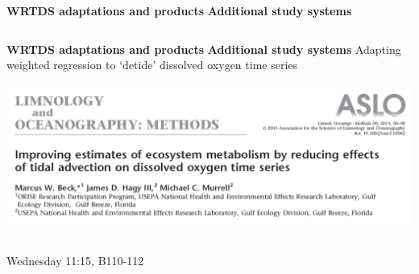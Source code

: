 \documentclass[serif]{beamer}\usepackage[]{graphicx}\usepackage[]{color}
\begin{document}
\begin{frame}{\textbf{WRTDS adaptations and products}}{\textbf{ Additional study systems}}
\begin{columns}
\begin{column}{0.65\textwidth}
\end{column}
\end{columns}
\end{frame}

\begin{frame}{\textbf{WRTDS adaptations and products}}{\textbf{ Additional study systems}}
Adapting weighted regression to `detide' dissolved oxygen time series \cite{Beck15b}\\~\\
\includegraphics[width = \textwidth]{fig/lopaper.png} \\~\\
\centerline{\alert{Wednesday 11:15, B110-112}}
\end{frame}
\end{document}
